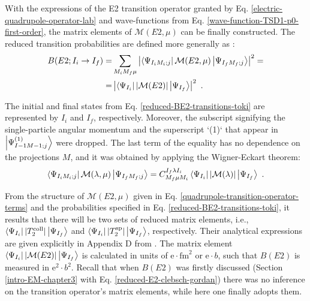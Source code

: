 With the expressions of the E2 transition operator granted by Eq. \ref{electric-quadrupole-operator-lab} and wave-functions from Eq. \ref{wave-function-TSD1-p0-first-order}, the matrix elements of $\mathcal{M}(E2,\mu)$ can be finally constructed. The reduced transition probabilities are defined more generally as \cite{toki1975asymmetric}:
\begin{align}
    B(E2;I_i\to I_f)=&\sum_{M_iM_f\mu}\left|\bra{\Psi_{I_iM_i;j}}\mathcal{M}(E2,\mu)\ket{\Psi_{I_fM_f;j}}\right|^2=\nonumber\\
                                            =&\left|\bra{\Psi_{I_i}}\left|\mathcal{M}(E2)\right|\ket{\Psi_{I_f}}\right|^2\ .
    \label{reduced-BE2-transitions-toki}
\end{align}

The initial and final states from Eq. \ref{reduced-BE2-transitions-toki} are represented by $I_i$ and $I_f$, respectively. Moreover, the subscript signifying the single-particle angular momentum and the superscript `(1)` that appear in $\ket{\Psi_{I-1M-1;j}^{(1)}}$ were dropped. The last term of the equality has no dependence on the projections $M$, and it was obtained by applying the Wigner-Eckart theorem:
\begin{align}
    \bra{\Psi_{I_iM_i;j}}\mathcal{M}(\lambda,\mu)\ket{\Psi_{I_fM_f;j}}=C_{M_f\mu M_i}^{I_f\lambda I_i}\bra{\Psi_{I_i}}|\mathcal{M}(\lambda)|\ket{\Psi_{I_f}}\ .
\end{align}  

From the structure of $\mathcal{M}(E2,\mu)$ given in Eq. \ref{quadrupole-transition-operator-terms} and the probabilities specified in Eq. \ref{reduced-BE2-transitions-toki}, it results that there will be two sets of reduced matrix elements, i.e., $\bra{\Psi_{I_i}}|T_2^\text{coll}|\ket{\Psi_{I_f}}$ and $\bra{\Psi_{I_i}}|T_2^\text{sp}|\ket{\Psi_{I_f}}$, respectively.  Their analytical expressions are given explicitly in Appendix D from \cite{raduta2017semiclassical}. The matrix element $\bra{\Psi_{I_i}}|\mathcal{M}(E2)|\ket{\Psi_{I_f}}$ is calculated in units of $\mathrm{e}\cdot\text{fm}^2$ or $\mathrm{e}\cdot b$, such that $B(E2)$ is measured in $\mathrm{e}^2\cdot b^2$. Recall that when $B(E2)$ was firstly discussed (Section \ref{intro-EM-chapter3} with Eq. \ref{reduced-E2-clebsch-gordan}) there was no inference on the transition operator's matrix elements, while here one finally adopts them.

